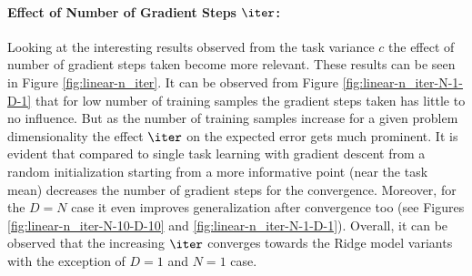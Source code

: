 \paragraph{Effect of Number of Gradient Steps $\iter$:} Looking at the interesting results observed from the task variance $c$  the effect of number of gradient steps taken become more relevant. These results can be seen in Figure \ref{fig:linear-n_iter}. It can be observed from Figure \ref{fig:linear-n_iter-N-1-D-1} that for low number of training samples the gradient steps taken has little to no influence. But as the number of training samples increase for a given problem dimensionality the effect $\iter$ on the expected  error gets much prominent. It is evident that compared to single task learning with gradient descent from a random initialization starting from a more informative point (\eg near the task mean) decreases the number of gradient steps for the convergence. Moreover, for the $D=N$ case it even improves generalization after convergence too (see Figures \ref{fig:linear-n_iter-N-10-D-10} and \ref{fig:linear-n_iter-N-1-D-1}). Overall, it can be observed that the increasing $\iter$ converges towards the Ridge model variants with the exception of $D=1$ and $N=1$ case.
 

